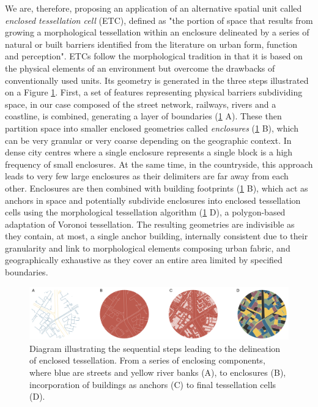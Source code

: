 We are, therefore, proposing an application of an alternative spatial unit called \textit{enclosed
tessellation cell} (ETC), defined as "the portion of space that results 
from growing a morphological tessellation within an enclosure delineated by a series
of natural or built barriers identified from the literature on urban form, function and
perception"\cite{dab_mf_2021a}.
ETCs follow the morphological tradition in that it is
based on the physical elements of an environment but overcome the drawbacks of
conventionally used units. Its geometry is generated in the three steps illustrated on a
Figure \ref{fig:et_diagram}. First, a set of features representing physical barriers
subdividing space, in our case composed of the street network, railways, rivers and a
coastline, is combined, generating a layer of boundaries (\ref{fig:et_diagram} A).
These then partition space
into smaller enclosed geometries called \textit{enclosures} (\ref{fig:et_diagram} B),
which can be very granular
or very coarse depending on the geographic context. In dense city centres where a single
enclosure represents a single block is a high frequency of small enclosures. At the same time, in the
countryside, this approach leads to very few large enclosures as their delimiters are far away
from each other. Enclosures are then combined with building footprints (\ref{fig:et_diagram} B),
which act as
anchors in space and potentially subdivide enclosures into enclosed tessellation cells using the
morphological tessellation algorithm\cite{fleischmann2020} (\ref{fig:et_diagram} D),
a polygon-based adaptation of Voronoi
tessellation. The resulting geometries are indivisible as they contain, at most, a single
anchor building, internally consistent due to their granularity and link to morphological
elements composing urban fabric, and geographically exhaustive as they cover an entire area
limited by specified boundaries.

\begin{figure}
    \includegraphics[width=\linewidth]{fig/et_diagram.pdf}
    \caption{Diagram illustrating the sequential steps leading to the delineation of
    enclosed tessellation. From a series of enclosing components, where blue are streets
    and yellow river banks (A), to enclosures (B), incorporation of buildings as anchors
    (C) to final tessellation cells (D).}
    \label{fig:et_diagram}
\end{figure}

